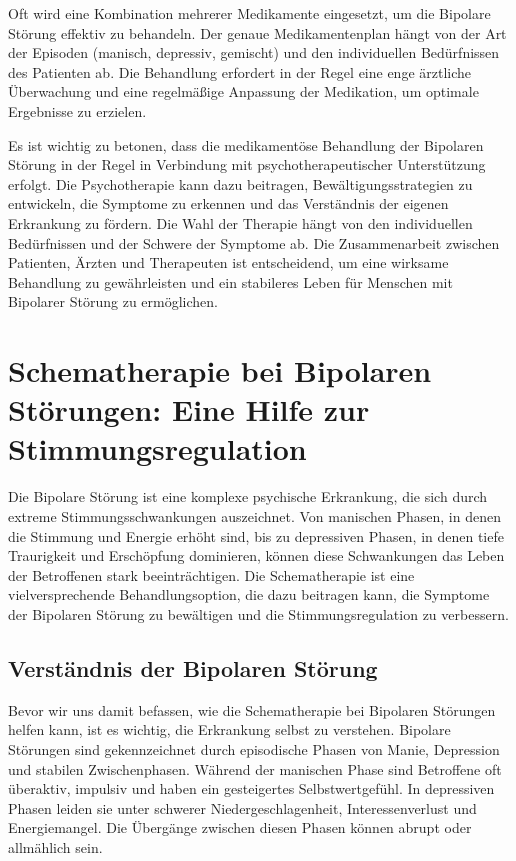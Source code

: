 Oft wird eine Kombination mehrerer Medikamente eingesetzt, um die Bipolare Störung effektiv zu behandeln. Der genaue Medikamentenplan hängt von der Art der Episoden (manisch, depressiv, gemischt) und den individuellen Bedürfnissen des Patienten ab. Die Behandlung erfordert in der Regel eine enge ärztliche Überwachung und eine regelmäßige Anpassung der Medikation, um optimale Ergebnisse zu erzielen.

Es ist wichtig zu betonen, dass die medikamentöse Behandlung der Bipolaren Störung in der Regel in Verbindung mit psychotherapeutischer Unterstützung erfolgt. Die Psychotherapie kann dazu beitragen, Bewältigungsstrategien zu entwickeln, die Symptome zu erkennen und das Verständnis der eigenen Erkrankung zu fördern. Die Wahl der Therapie hängt von den individuellen Bedürfnissen und der Schwere der Symptome ab. Die Zusammenarbeit zwischen Patienten, Ärzten und Therapeuten ist entscheidend, um eine wirksame Behandlung zu gewährleisten und ein stabileres Leben für Menschen mit Bipolarer Störung zu ermöglichen.


\section{Schematherapie bei Bipolaren Störungen: Eine Hilfe zur Stimmungsregulation}

Die Bipolare Störung ist eine komplexe psychische Erkrankung, die sich durch extreme Stimmungsschwankungen auszeichnet. Von manischen Phasen, in denen die Stimmung und Energie erhöht sind, bis zu depressiven Phasen, in denen tiefe Traurigkeit und Erschöpfung dominieren, können diese Schwankungen das Leben der Betroffenen stark beeinträchtigen. Die Schematherapie ist eine vielversprechende Behandlungsoption, die dazu beitragen kann, die Symptome der Bipolaren Störung zu bewältigen und die Stimmungsregulation zu verbessern.

\subsection{Verständnis der Bipolaren Störung}

Bevor wir uns damit befassen, wie die Schematherapie bei Bipolaren Störungen helfen kann, ist es wichtig, die Erkrankung selbst zu verstehen. Bipolare Störungen sind gekennzeichnet durch episodische Phasen von Manie, Depression und stabilen Zwischenphasen. Während der manischen Phase sind Betroffene oft überaktiv, impulsiv und haben ein gesteigertes Selbstwertgefühl. In depressiven Phasen leiden sie unter schwerer Niedergeschlagenheit, Interessenverlust und Energiemangel. Die Übergänge zwischen diesen Phasen können abrupt oder allmählich sein.

